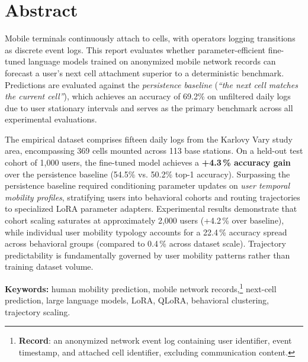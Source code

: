 \chapter*{Abstract}
\thispagestyle{plain}

Mobile terminals continuously attach to cells, with operators logging transitions as discrete event logs. This report evaluates whether parameter-efficient fine-tuned language models trained on anonymized mobile network records can forecast a user's next cell attachment superior to a deterministic benchmark. Predictions are evaluated against the \emph{persistence baseline} (\emph{``the next cell matches the current cell''}), which achieves an accuracy of 69.2\% on unfiltered daily logs due to user stationary intervals and serves as the primary benchmark across all experimental evaluations.

The empirical dataset comprises fifteen daily logs from the Karlovy Vary study area, encompassing 369 cells mounted across 113 base stations. On a held-out test cohort of 1,000 users, the fine-tuned model achieves a \textbf{+4.3\,\% accuracy gain} over the persistence baseline (54.5\% vs. 50.2\% top-1 accuracy). Surpassing the persistence baseline required conditioning parameter updates on \emph{user temporal mobility profiles}, stratifying users into behavioral cohorts and routing trajectories to specialized LoRA parameter adapters. Experimental results demonstrate that cohort scaling saturates at approximately 2,000 users (+4.2\,\% over baseline), while individual user mobility typology accounts for a 22.4\,\% accuracy spread across behavioral groups (compared to 0.4\,\% across dataset scale). Trajectory predictability is fundamentally governed by user mobility patterns rather than training dataset volume.

\vspace{0.8em}
\noindent\textbf{Keywords:} human mobility prediction, mobile network records,\footnote{\textbf{Record}: an anonymized network event log containing user identifier, event timestamp, and attached cell identifier, excluding communication content.} next-cell prediction, large language models, LoRA, QLoRA, behavioral clustering, trajectory scaling.

